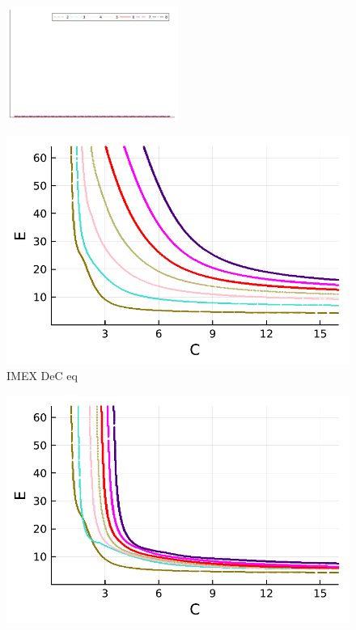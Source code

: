 \begin{figure}
	\centering
	\includegraphics[width=0.5\textwidth,trim={160 340 30 22}, clip]{pdf/pdepics/legends/colors_a-d_new_horiz_2-8_no_order.pdf}\\	\begin{minipage}[t]{0.32\textwidth}
		\includegraphics[width=\textwidth]{pdf/pdepics/diff/IMEXDeC_equispaced_TMM_ord_2-8.pdf}
		\centering
		IMEX DeC eq
	\end{minipage} 
	\begin{minipage}[t]{0.32\textwidth}
		\includegraphics[width=\textwidth]{pdf/pdepics/diff/IMEXDeC_subtimesteps_equispaced_TMM_ord_2-8.pdf}

\end{minipage}
\end{figure}
